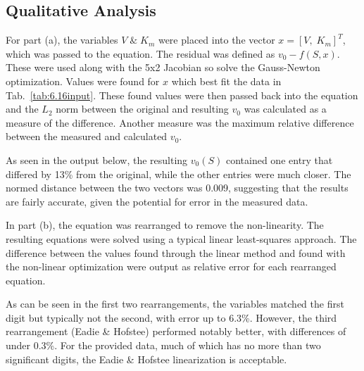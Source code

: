 \documentclass[paper=a4, fontsize=11pt]{scrartcl}
\numberwithin{equation}{section}		%
\numberwithin{figure}{section}			%
\numberwithin{table}{section}				%
\begin{document}
\vspace{4mm}
\subsection{Qualitative Analysis}
\par For part (a), the variables $V \; \& \; K_m$ were placed into the vector $x = [V, \; K_m]^T$, which was passed to the equation. The residual was defined as $v_0 - f(S, x)$. These were used along with the 5x2 Jacobian so solve the Gauss-Newton optimization. Values were found for $x$ which best fit the data in Tab.~\ref{tab:6.16input}. These found values were then passed back into the equation and the $L_2$ norm between the original and resulting $v_0$ was calculated as a measure of the difference. Another measure was the maximum relative difference between the measured and calculated $v_0$. \\
\par As seen in the output below, the resulting $v_0(S)$ contained one entry that differed by 13\% from the original, while the other entries were much closer. The normed distance between the two vectors was 0.009, suggesting that the results are fairly accurate, given the potential for error in the measured data. \\
\par In part (b), the equation was rearranged to remove the non-linearity. The resulting equations were solved using a typical linear least-squares approach. The difference between the values found through the linear method and found with the non-linear optimization were output as relative error for each rearranged equation. \\
\par As can be seen in the first two rearrangements, the variables matched the first digit but typically not the second, with error up to 6.3\%. However, the third rearrangement (Eadie \& Hofstee) performed notably better, with differences of under 0.3\%. For the provided data, much of which has no more than two significant digits, the Eadie \& Hofstee linearization is acceptable. \\ 

\vspace{4mm}
\end{document}
